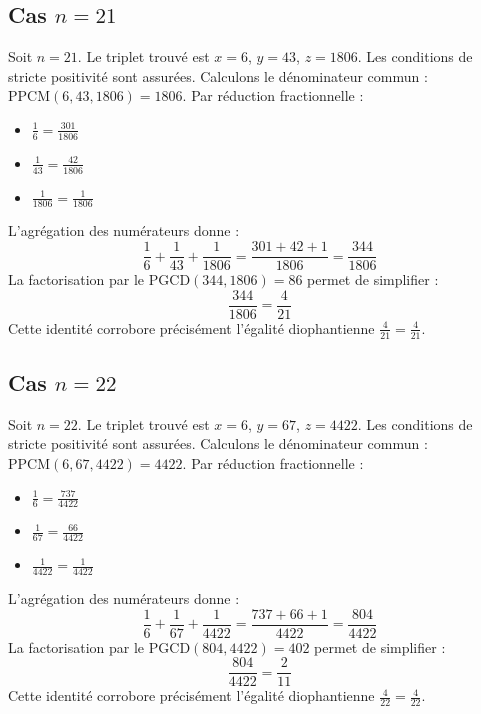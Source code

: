 \documentclass[11pt,a4paper]{article}
\begin{document}
\subsection{Cas $n = 21$}
Soit $n = 21$. Le triplet trouvé est $x = 6$, $y = 43$, $z = 1806$.
Les conditions de stricte positivité sont assurées.
Calculons le dénominateur commun : $\text{PPCM}(6, 43, 1806) = 1806$.
Par réduction fractionnelle :
\begin{itemize}
    \item $\frac{1}{6} = \frac{301}{1806}$
    \item $\frac{1}{43} = \frac{42}{1806}$
    \item $\frac{1}{1806} = \frac{1}{1806}$
\end{itemize}
L'agrégation des numérateurs donne :
$$ \frac{1}{6} + \frac{1}{43} + \frac{1}{1806} = \frac{301 + 42 + 1}{1806} = \frac{344}{1806} $$
La factorisation par le $\text{PGCD}(344, 1806) = 86$ permet de simplifier :
$$ \frac{344}{1806} = \frac{4}{21} $$
Cette identité corrobore précisément l'égalité diophantienne $\frac{4}{21} = \frac{4}{21}$.

\subsection{Cas $n = 22$}
Soit $n = 22$. Le triplet trouvé est $x = 6$, $y = 67$, $z = 4422$.
Les conditions de stricte positivité sont assurées.
Calculons le dénominateur commun : $\text{PPCM}(6, 67, 4422) = 4422$.
Par réduction fractionnelle :
\begin{itemize}
    \item $\frac{1}{6} = \frac{737}{4422}$
    \item $\frac{1}{67} = \frac{66}{4422}$
    \item $\frac{1}{4422} = \frac{1}{4422}$
\end{itemize}
L'agrégation des numérateurs donne :
$$ \frac{1}{6} + \frac{1}{67} + \frac{1}{4422} = \frac{737 + 66 + 1}{4422} = \frac{804}{4422} $$
La factorisation par le $\text{PGCD}(804, 4422) = 402$ permet de simplifier :
$$ \frac{804}{4422} = \frac{2}{11} $$
Cette identité corrobore précisément l'égalité diophantienne $\frac{4}{22} = \frac{4}{22}$.
\end{document}
